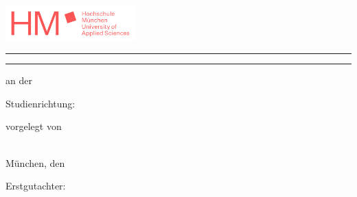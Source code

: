\thispagestyle{empty}

\begin{minipage}[c][\textheight][s]{\textwidth}

\begin{flushright}
\includegraphics[width=5cm,keepaspectratio]{logos/hm_logo.png}
\end{flushright}

\vspace{0.5cm}

\noindent\rule{\linewidth}{0.4mm}

\vspace{0.5cm}

\begin{flushright}
  \sffamily\bfseries\Large
  \parbox{0.9\textwidth}{\raggedleft\getTitle}
  
  \vspace{0.3cm}
  
  {\large\getAuthor}
\end{flushright}

\vspace{0.5cm}

\noindent\rule{\linewidth}{0.4mm}

\vfill

\begin{center}
  \large
  \getDoctype
  
  \vspace{0.3cm}
  
  an der \getUniversity\\
  \getFaculty
  
  \vspace{0.5cm}
  
  Studienrichtung: \getCourse
  
  \vspace{0.5cm}
  
  vorgelegt von\\
  \getAuthor\ 
  
  \vfill
  
  München, den \getSubmissionDate
  
  \vspace{0.5cm}
  
  Erstgutachter: \getSupervisor
\end{center}

\end{minipage}
\clearpage